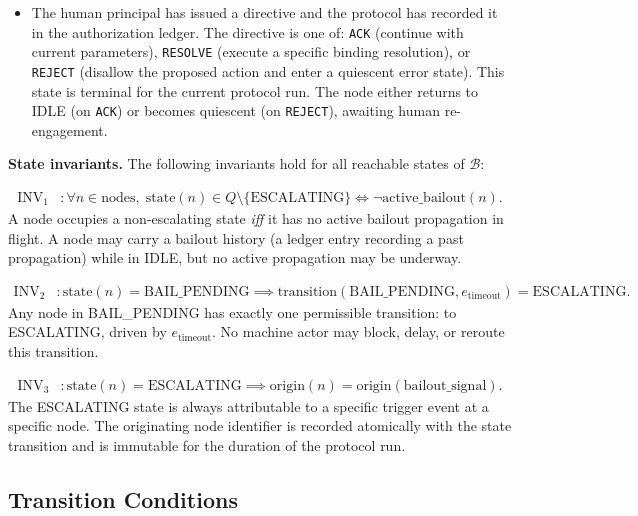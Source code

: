 \begin{itemize}
\item[\textbf{RESOLVED.}] The human principal has issued a directive and the protocol has recorded it in the authorization ledger. The directive is one of: \texttt{ACK} (continue with current parameters), \texttt{RESOLVE} (execute a specific binding resolution), or \texttt{REJECT} (disallow the proposed action and enter a quiescent error state). This state is terminal for the current protocol run. The node either returns to IDLE (on \texttt{ACK}) or becomes quiescent (on \texttt{REJECT}), awaiting human re-engagement.
\end{itemize}

\medskip\noindent\textbf{State invariants.} The following invariants hold for all reachable states of $\mathcal{B}$:

\begin{align}
\text{INV}_1 &: \forall n \in \text{nodes},\; \text{state}(n) \in Q \setminus \{\text{ESCALATING}\} \iff \neg\text{active\_bailout}(n). \tag{INV-1}
\end{align}
A node occupies a non-escalating state \emph{iff} it has no active bailout propagation in flight. A node may carry a bailout history (a ledger entry recording a past propagation) while in IDLE, but no active propagation may be underway.

\begin{align}
\text{INV}_2 &: \text{state}(n) = \text{BAIL\_PENDING} \implies \text{transition}(\text{BAIL\_PENDING}, e_{\text{timeout}}) = \text{ESCALATING}. \tag{INV-2}
\end{align}
Any node in BAIL\_PENDING has exactly one permissible transition: to ESCALATING, driven by $e_{\text{timeout}}$. No machine actor may block, delay, or reroute this transition.

\begin{align}
\text{INV}_3 &: \text{state}(n) = \text{ESCALATING} \implies \text{origin}(n) = \text{origin}(\text{bailout\_signal}). \tag{INV-3}
\end{align}
The ESCALATING state is always attributable to a specific trigger event at a specific node. The originating node identifier is recorded atomically with the state transition and is immutable for the duration of the protocol run.

\subsection{Transition Conditions}\label{sec:transition-conditions}

